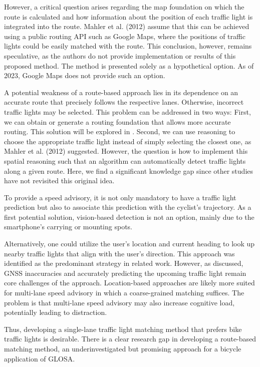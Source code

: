 However, a critical question arises regarding the map foundation on which the route is calculated and how information about the position of each traffic light is integrated into the route. Mahler et al. (2012) \cite{mahler_reducing_2012} assume that this can be achieved using a public routing API such as Google Maps, where the positions of traffic lights could be easily matched with the route. This conclusion, however, remains speculative, as the authors do not provide implementation or results of this proposed method. The method is presented solely as a hypothetical option. As of 2023, Google Maps does not provide such an option.

A potential weakness of a route-based approach lies in its dependence on an accurate route that precisely follows the respective lanes. Otherwise, incorrect traffic lights may be selected. This problem can be addressed in two ways: First, we can obtain or generate a routing foundation that allows more accurate routing. This solution will be explored in  . Second, we can use reasoning to choose the appropriate traffic light instead of simply selecting the closest one, as Mahler et al. (2012) \cite{mahler_reducing_2012} suggested. However, the question is how to implement this spatial reasoning such that an algorithm can automatically detect traffic lights along a given route. Here, we find a significant knowledge gap since other studies have not revisited this original idea.

\begin{Summary}
To provide a speed advisory, it is not only mandatory to have a traffic light prediction but also to associate this prediction with the cyclist's trajectory. As a first potential solution, vision-based detection is not an option, mainly due to the smartphone's carrying or mounting spots. 

Alternatively, one could utilize the user's location and current heading to look up nearby traffic lights that align with the user's direction. This approach was identified as the predominant strategy in related work. However, as discussed, GNSS inaccuracies and accurately predicting the upcoming traffic light remain core challenges of the approach. Location-based approaches are likely more suited for multi-lane speed advisory in which a coarse-grained matching suffices. The problem is that multi-lane speed advisory may also increase cognitive load, potentially leading to distraction. 

Thus, developing a single-lane traffic light matching method that prefers bike traffic lights is desirable. There is a clear research gap in developing a route-based matching method, an underinvestigated but promising approach for a bicycle application of GLOSA.
\end{Summary}

